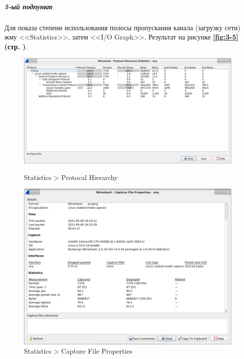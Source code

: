 \subparagraph{5-ый подпункт}
Для показа степени использования полосы пропускания канала (загрузку сети)
жму <<Statistics>>, затем <<I/O Graph>>.
Результат на рисунке \textbf{\ref{fig:3-5} (стр. \pageref{fig:3-5})}.

\begin{figure}[!htp]
    \centering
    \begin{minipage}{.64\textwidth}
        \centering
        \includegraphics[width=.99\textwidth]
        {../_INCLUDES/main/task3/3-1.png}
        \caption{Statistics > Protocal Hierarchy}
        \label{fig:3-1}
    \end{minipage}
    \begin{minipage}{.34\textwidth}
        \centering
        \includegraphics[width=.99\textwidth]
        {../_INCLUDES/main/task3/3-2.png}
        \caption{Statistics > Capture File Properties}
        \label{fig:3-2}
    \end{minipage}
\end{figure}

